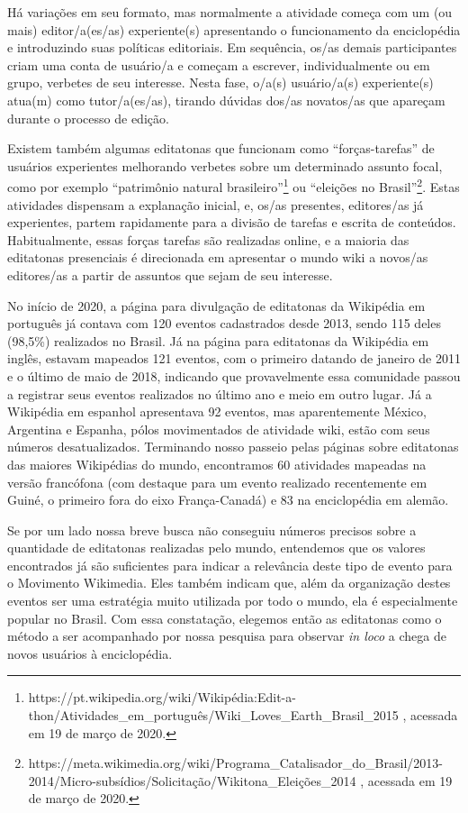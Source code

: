 Há variações em seu formato, mas normalmente a atividade começa com um (ou mais) editor/a(es/as) experiente(s) apresentando o funcionamento da enciclopédia e introduzindo suas políticas editoriais. Em sequência, os/as demais participantes criam uma conta de usuário/a e começam a escrever, individualmente ou em grupo, verbetes de seu interesse. Nesta fase, o/a(s) usuário/a(s) experiente(s) atua(m) como tutor/a(es/as), tirando dúvidas dos/as novatos/as que apareçam durante o processo de edição.

Existem também algumas editatonas que funcionam como ``forças-tarefas'' de usuários experientes melhorando verbetes sobre um determinado assunto focal, como por exemplo ``patrimônio natural brasileiro''\footnote{https://pt.wikipedia.org/wiki/Wikipédia:Edit-a-thon/Atividades\_em\_português/Wiki\_Loves\_Earth\_Brasil\_2015 , acessada em 19 de março de 2020.} ou ``eleições no Brasil''\footnote{https://meta.wikimedia.org/wiki/Programa\_Catalisador\_do\_Brasil/2013-2014/Micro-subsídios/Solicitação/Wikitona\_Eleições\_2014 , acessada em 19 de março de 2020.}. Estas atividades dispensam a explanação inicial, e, os/as presentes, editores/as já experientes, partem rapidamente para a divisão de tarefas e escrita de conteúdos. Habitualmente, essas forças tarefas são realizadas online, e a maioria das editatonas presenciais é direcionada em apresentar o mundo wiki a novos/as editores/as a partir de assuntos que sejam de seu interesse.

No início de 2020, a página para divulgação de editatonas da Wikipédia em português já contava com 120 eventos cadastrados desde 2013, sendo 115 deles (98,5\%) realizados no Brasil. Já na página para editatonas da Wikipédia em inglês, estavam mapeados 121 eventos, com o primeiro datando de janeiro de 2011 e o último de maio de 2018, indicando que provavelmente essa comunidade passou a registrar seus eventos realizados no último ano e meio em outro lugar. Já a Wikipédia em espanhol apresentava 92 eventos, mas aparentemente México, Argentina e Espanha, pólos movimentados de atividade wiki, estão com seus números desatualizados. Terminando nosso passeio pelas páginas sobre editatonas das maiores Wikipédias do mundo, encontramos 60 atividades mapeadas na versão francófona (com destaque para um evento realizado recentemente em Guiné, o primeiro fora do eixo França-Canadá) e 83 na enciclopédia em alemão.

Se por um lado nossa breve busca não conseguiu números precisos sobre a quantidade de editatonas realizadas pelo mundo, entendemos que os valores encontrados já são suficientes para indicar a relevância deste tipo de evento para o Movimento Wikimedia. Eles também indicam que, além da organização destes eventos ser uma estratégia muito utilizada por todo o mundo, ela é especialmente popular no Brasil. Com essa constatação, elegemos então as editatonas como o método a ser acompanhado por nossa pesquisa para observar \textit{in loco} a chega de novos usuários à enciclopédia.
